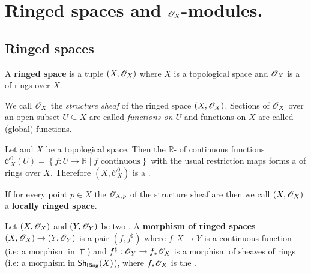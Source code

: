 \documentclass[../main.tex]{subfiles}
\begin{document}
\chapter{Ringed spaces and \(\mathscr{O}_{X}\)-modules.}
\section{Ringed spaces}

\begin{definition} \label{def:ringed-space}
  A \textbf{ringed space} is a tuple \((X, \mathscr{O}_{X})\) where \(X\) is a topological space and \(\mathscr{O}_{X}\) is a  of rings over \(X\).

  We call \(\mathscr{O}_{X}\) the \textit{structure sheaf} of the ringed space \((X, \mathscr{O}_{X})\).
  Sections of \(\mathscr{O}_{X}\) over an open subset \(U \subseteq X\) are called \textit{functions on \(U\)} and functions on \(X\) are called (global) functions.
\end{definition}

\begin{example}
  Let and \(X\) be a topological space.
  Then the \(\mathbb{R}\)- of continuous functions \(\mathcal{C}_{X}^{0}(U) = \left\{ f: U \to \mathbb{R} \mid f \text{ continuous} \right\}\) with the usual restriction maps forms a  of rings over \(X\).
  Therefore \((X, \mathcal{C}_{X}^{0})\) is a .
\end{example}

\begin{example}
  If for every point \(p \in X\) the  \(\mathscr{O}_{X, p}\) of the structure sheaf are  then we call \((X, \mathscr{O}_{X})\) a \textbf{locally ringed space}.
\end{example}


\begin{definition} \label{def:ringed-spaces-morphism}
  Let \((X, \mathscr{O}_{X})\) and \((Y, \mathscr{O}_{Y})\) be two .
  A \textbf{morphism of ringed spaces} \((X, \mathscr{O}_{X}) \to (Y, \mathscr{O}_{Y})\) is a pair \((f, f^{\sharp})\) where \(f: X \to Y\) is a continuous function (i.e: a morphism in \(\Top\)) and \(f^{\sharp}: \mathscr{O}_{Y} \to f_{\ast}\mathscr{O}_{X}\) is a morphism of sheaves of rings (i.e: a morphism in \(\mathsf{Sh}_{\mathsf{Ring}}(X)\)), where \(f_{\ast}\mathscr{O}_{X}\) is the .
\end{definition}
\end{document}
